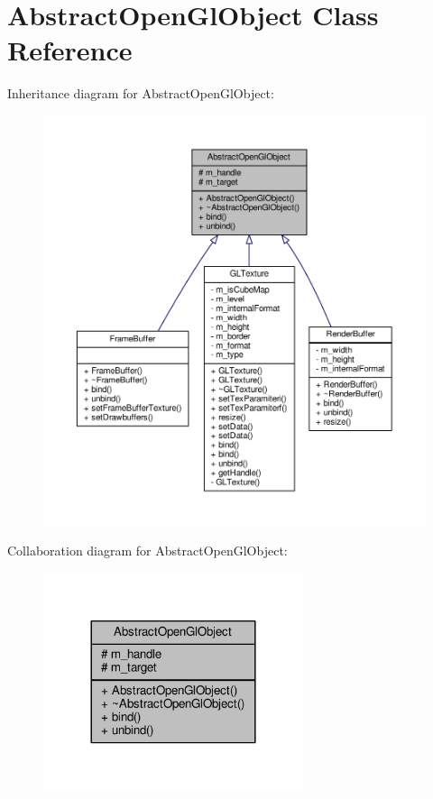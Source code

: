 \hypertarget{class_abstract_open_gl_object}{\section{Abstract\-Open\-Gl\-Object Class Reference}
\label{class_abstract_open_gl_object}
}


Inheritance diagram for Abstract\-Open\-Gl\-Object\-:\nopagebreak
\begin{figure}[H]
\begin{center}
\leavevmode
\includegraphics[width=350pt]{class_abstract_open_gl_object__inherit__graph}
\end{center}
\end{figure}


Collaboration diagram for Abstract\-Open\-Gl\-Object\-:\nopagebreak
\begin{figure}[H]
\begin{center}
\leavevmode
\includegraphics[width=216pt]{class_abstract_open_gl_object__coll__graph}
\end{center}
\end{figure}
